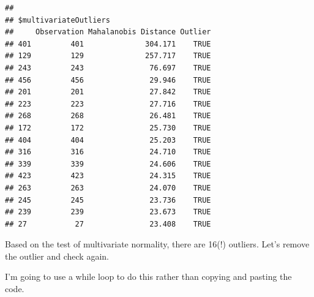 \documentclass{article}\usepackage[]{graphicx}\usepackage[]{color}
\makeatletter
\newenvironment{kframe}{%
 \def\at@end@of@kframe{}%
 \ifinner\ifhmode%
  \def\at@end@of@kframe{\end{minipage}}%
  \begin{minipage}{\columnwidth}%
 \fi\fi%
 \def\FrameCommand##1{\hskip\@totalleftmargin \hskip-\fboxsep
 \colorbox{shadecolor}{##1}\hskip-\fboxsep
     \hskip-\linewidth \hskip-\@totalleftmargin \hskip\columnwidth}%
 \MakeFramed {\advance\hsize-\width
   \@totalleftmargin\z@ \linewidth\hsize
   \@setminipage}}%
 {\par\unskip\endMakeFramed%
 \at@end@of@kframe}
\newenvironment{knitrout}{}{} %
\makeatother
\begin{document}
\begin{knitrout}
\begin{kframe}
\begin{verbatim}
## 
## $multivariateOutliers
##     Observation Mahalanobis Distance Outlier
## 401         401              304.171    TRUE
## 129         129              257.717    TRUE
## 243         243               76.697    TRUE
## 456         456               29.946    TRUE
## 201         201               27.842    TRUE
## 223         223               27.716    TRUE
## 268         268               26.481    TRUE
## 172         172               25.730    TRUE
## 404         404               25.203    TRUE
## 316         316               24.710    TRUE
## 339         339               24.606    TRUE
## 423         423               24.315    TRUE
## 263         263               24.070    TRUE
## 245         245               23.736    TRUE
## 239         239               23.673    TRUE
## 27           27               23.408    TRUE
\end{verbatim}
\end{kframe}
\end{knitrout}

Based on the test of multivariate normality, there are 16(!) outliers. Let's remove the outlier and check again.

I'm going to use a while loop to do this rather than copying and pasting the code. 
\end{document}
